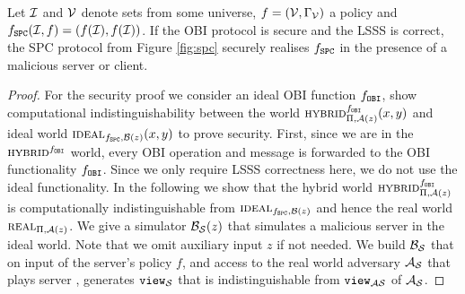 \begin{lemma}[Privacy]\label{lem:SPCprivacy}
 Let $\mathcal{I}$ and $\mathcal{V}$ denote sets from some universe, $f=(\mathcal{V},\Gamma_\mathcal{V})$ a policy and $f_\mathtt{SPC}(\mathcal{I}, f)=(f(\mathcal{I}), f(\mathcal{I}))$. 
 If the \ac{OBI} protocol is secure and the \ac{LSSS} is correct, the \ac{SPC} protocol from Figure \ref{fig:spc} securely realises $f_\mathtt{SPC}$ in the presence of a malicious server or client.
\end{lemma}

\begin{proof}
For the security proof we consider an ideal \ac{OBI} function $f_\mathtt{OBI}$, \ie show computational indistinguishability between the world $\HYBRID^{f_\OBI}_{\Pi, \cA(z)} (x, y)$ and ideal world $\IDEAL_{f_\SPC, \cB(z)}(x, y)$ to prove security. 
First, since we are in the $\HYBRID^{f_\OBI}$ world, every \ac{OBI} operation and message is forwarded to the \ac{OBI} functionality $f_\mathtt{OBI}$.
Since we only require \ac{LSSS} correctness here, we do not use the ideal functionality.
In the following we show that the hybrid world $\HYBRID^{f_\OBI}_{\Pi, \cA(z)}$ is computationally indistinguishable from $\IDEAL_{f_\SPC, \cB(z)}$ and hence the real world $\REAL_{\Pi, \cA(z)}$. 
We give a simulator $\mathcal{B}_\mathcal{S}(z)$ that simulates a malicious server in the ideal world. 
Note that we omit auxiliary input $z$ if not needed. 
We build $\mathcal{B}_\mathcal{S}$ that on input of the server's policy $f$, and access to the real world adversary $\mathcal{A}_\mathcal{S}$ that plays server \Server, generates $\mathtt{view}_\mathcal{S}$ that is indistinguishable from $\mathtt{view}_{\mathcal{A}\mathcal{S}}$ of $\mathcal{A}_\mathcal{S}$.


\end{proof}
